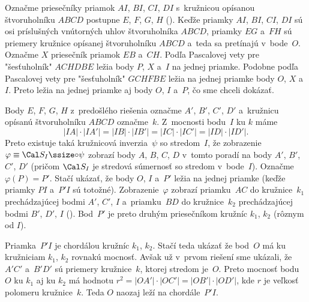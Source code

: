 {%
Označme priesečníky priamok $AI$, $BI$, $CI$, $DI$ s~kružnicou opísanou štvoruholníku $ABCD$ postupne
$E$, $F$, $G$, $H$ (\obr). Keďže priamky $AI$, $BI$, $CI$, $DI$ sú osi príslušných vnútorných uhlov štvoruholníka
$ABCD$, priamky $EG$ a~$FH$ sú priemery kružnice opísanej štvoruholníku $ABCD$ a~teda sa pretínajú v~bode~$O$.
Označme $X$ priesečník priamok $EB$ a~$CH$. Podľa Pascalovej vety pre "šesťuholník" $ACHDBE$ ležia body
$P$, $X$ a~$I$ na jednej priamke. Podobne podľa Pascalovej vety pre "šesťuholník" $GCHFBE$ ležia na jednej priamke 
body $O$, $X$ a~$I$. Preto ležia na jednej priamke aj body $O$, $I$ a~$P$, čo sme chceli dokázať.
%

\ineriesenie
{}
Body $E$, $F$, $G$, $H$ z~predošlého riešenia označme $A'$, $B'$, $C'$, $D'$ a~kružnicu opísanú štvoruholníku $ABCD$ označme~$k$. Z~mocnosti bodu~$I$ ku $k$ máme
$$
|IA|\cdot|IA'|=|IB|\cdot|IB'|=|IC|\cdot|IC'|=|ID|\cdot|ID'|.
$$
Preto existuje taká kružnicová inverzia~$\psi$ so stredom~$I$, že zobrazenie $\varphi\equiv\Cal S_I{\ssize\circ}\psi$ zobrazí body $A$, $B$, $C$, $D$ v~tomto poradí na body $A'$, $B'$, $C'$, $D'$ (pričom $\Cal S_I$ je stredová súmernosť so stredom v~bode~$I$). Označme $\varphi(P)=P'$. Stačí ukázať, že body $O$, $I$ a~$P'$ ležia na jednej priamke (keďže priamky $PI$ a~$P'I$ sú totožné). Zobrazenie~$\varphi$ zobrazí priamku~$AC$ do kružnice~$k_1$ prechádzajúcej bodmi $A'$, $C'$, $I$ a~priamku~$BD$ do kružnice~$k_2$ prechádzajúcej bodmi $B'$, $D'$, $I$ (\obr). Bod~$P'$ je preto druhým priesečníkom kružníc $k_1$, $k_2$ (rôznym od $I$).
%

Priamka~$P'I$ je chordálou kružníc $k_1$, $k_2$. Stačí teda ukázať že bod~$O$ má ku kružniciam $k_1$, $k_2$ rovnakú mocnosť. Avšak už v~prvom riešení sme ukázali, že $A'C'$ a~$B'D'$ sú priemery kružnice~$k$, ktorej stredom je~$O$. Preto mocnosť bodu~$O$ ku $k_1$ aj ku $k_2$ má hodnotu $r^2=|OA'|\cdot|OC'|=|OB'|\cdot|OD'|$, kde $r$ je veľkosť polomeru kružnice~$k$. Teda $O$ naozaj leží na chordále~$P'I$.}

